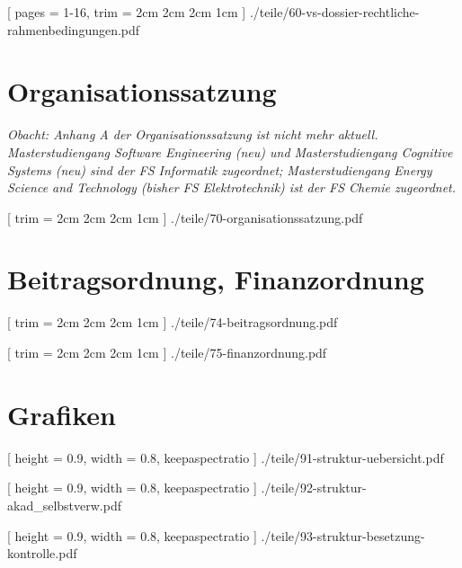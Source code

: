 \documentclass[
	10pt,
	a5paper,
	twoside
	]
	{book}
\begin{document}
\clearpage


	[
		pages = 1-16,
		trim = 2cm 2cm 2cm 1cm
	]
	{./teile/60-vs-dossier-rechtliche-rahmenbedingungen.pdf}


\chapter{Organisationssatzung}

\textit{Obacht: Anhang A der Organisationssatzung ist nicht mehr aktuell. Masterstudiengang Software Engineering (neu) und Masterstudiengang Cognitive Systems (neu) sind der FS Informatik zugeordnet; Masterstudiengang Energy Science and Technology (bisher FS Elektrotechnik) ist der FS Chemie zugeordnet.}

\clearpage


	[
		trim = 2cm 2cm 2cm 1cm
	]
	{./teile/70-organisationssatzung.pdf}


\chapter{Beitragsordnung, Finanzordnung}


\clearpage


[
trim = 2cm 2cm 2cm 1cm
]
{./teile/74-beitragsordnung.pdf}


	[
		trim = 2cm 2cm 2cm 1cm
	]
	{./teile/75-finanzordnung.pdf}


\chapter{Grafiken}

\clearpage



	[
		height = 0.9\paperheight,
		width = 0.8\paperwidth,
		keepaspectratio
	]
	{./teile/91-struktur-uebersicht.pdf}




	[
		height = 0.9\paperheight,
		width = 0.8\paperwidth,
		keepaspectratio
	]
	{./teile/92-struktur-akad_selbstverw.pdf}




	[
		height = 0.9\paperheight,
		width = 0.8\paperwidth,
		keepaspectratio
	]
	{./teile/93-struktur-besetzung-kontrolle.pdf}



\backmatter


\end{document}

